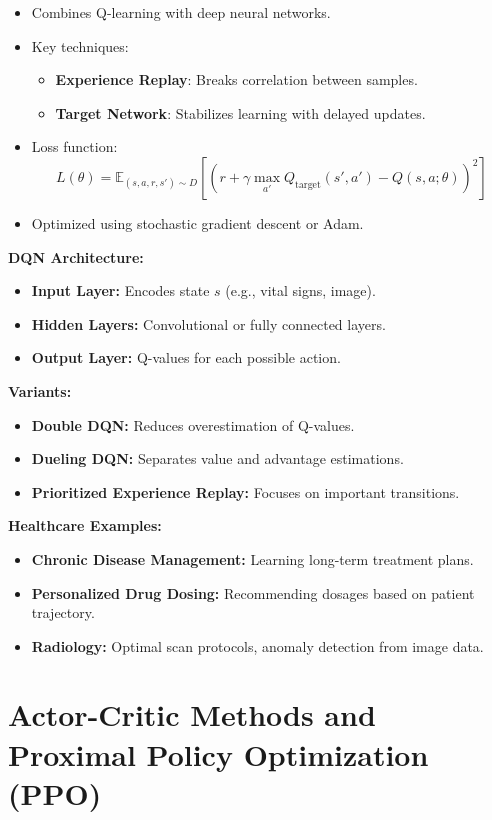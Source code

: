 \documentclass[12pt]{article}
\begin{document}
\begin{itemize}
    \item Combines Q-learning with deep neural networks.
    \item Key techniques:
    \begin{itemize}
        \item \textbf{Experience Replay}: Breaks correlation between samples.
        \item \textbf{Target Network}: Stabilizes learning with delayed updates.
    \end{itemize}
    \item Loss function:
    \[
    L(\theta) = \mathbb{E}_{(s,a,r,s') \sim D} \left[ \left( r + \gamma \max_{a'} Q_{\text{target}}(s',a') - Q(s,a;\theta) \right)^2 \right]
    \]
    \item Optimized using stochastic gradient descent or Adam.
\end{itemize}

\textbf{DQN Architecture:}
\begin{itemize}
    \item \textbf{Input Layer:} Encodes state $s$ (e.g., vital signs, image).
    \item \textbf{Hidden Layers:} Convolutional or fully connected layers.
    \item \textbf{Output Layer:} Q-values for each possible action.
\end{itemize}

\textbf{Variants:}
\begin{itemize}
    \item \textbf{Double DQN:} Reduces overestimation of Q-values.
    \item \textbf{Dueling DQN:} Separates value and advantage estimations.
    \item \textbf{Prioritized Experience Replay:} Focuses on important transitions.
\end{itemize}

\textbf{Healthcare Examples:}
\begin{itemize}
    \item \textbf{Chronic Disease Management:} Learning long-term treatment plans.
    \item \textbf{Personalized Drug Dosing:} Recommending dosages based on patient trajectory.
    \item \textbf{Radiology:} Optimal scan protocols, anomaly detection from image data.
\end{itemize}
\section{Actor-Critic Methods and Proximal Policy Optimization (PPO)}
\end{document}
